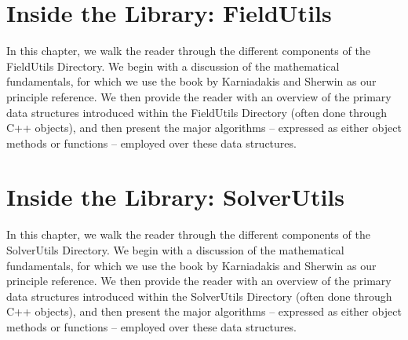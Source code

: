 \chapter{Inside the Library: FieldUtils}

In this chapter, we walk the reader through the different components of the FieldUtils Directory.
We begin with a discussion of the mathematical fundamentals, for which we use the book
by Karniadakis and Sherwin \cite{KaSh05} as our principle reference.  We then provide
the reader with an overview of the primary data structures introduced within the
FieldUtils Directory (often done through C++ objects), and then present the major 
algorithms -- expressed as either object methods or functions -- employed over these data structures.  





%


\chapter{Inside the Library: SolverUtils}

In this chapter, we walk the reader through the different components of the SolverUtils Directory.
We begin with a discussion of the mathematical fundamentals, for which we use the book
by Karniadakis and Sherwin \cite{KaSh05} as our principle reference.  We then provide
the reader with an overview of the primary data structures introduced within the
SolverUtils Directory (often done through C++ objects), and then present the major 
algorithms -- expressed as either object methods or functions -- employed over these data structures.  


%

%



